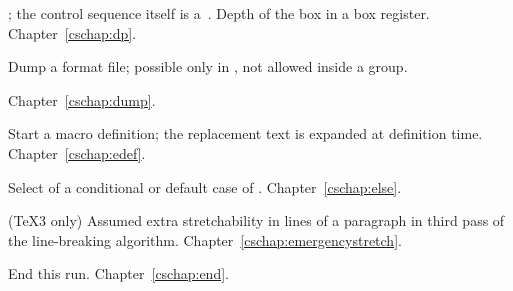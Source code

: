 \begin{glossinventory}
\item [\cs{dp\gr{8-bit number}}]
      ; the control sequence itself
      is a~.
      Depth of the box in a box register. 
Chapter~\ref{cschap:dp}.

\item [\cs{dump}]
      Dump a format file; possible only in \IniTeX, 
      not allowed inside a group.

Chapter~\ref{cschap:dump}.

\item [\cs{edef}]
      Start a macro definition; 
      the replacement text is expanded at definition time.
Chapter~\ref{cschap:edef}.

\item [\cs{else}]
      Select
       of a conditional 
      or default case of .
Chapter~\ref{cschap:else}.

\item [\cs{emergencystretch}]
      (\TeX3 only) 
      Assumed extra stretchability in lines of a paragraph
      in third pass of the line-breaking algorithm.
Chapter~\ref{cschap:emergencystretch}.

\item [\cs{end}]
      End this run.
Chapter~\ref{cschap:end}.


\end{glossinventory}
